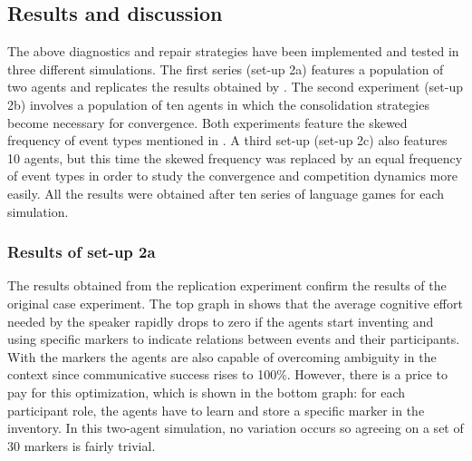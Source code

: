 \subsection{Results and discussion}

The above diagnostics and repair strategies have been implemented and tested in three different simulations. The first series (set-up 2a) features a population of two agents and replicates the results obtained by \citet{steels02simulating, steels04constructivist}. The second experiment (set-up 2b) involves a population of ten agents in which the consolidation strategies become necessary for convergence. Both experiments feature the skewed frequency of event types mentioned in . A third set-up (set-up 2c) also features 10 agents, but this time the skewed frequency was replaced by an equal frequency of event types in order to study the convergence and competition dynamics more easily. All the results were obtained after ten series of language games for each simulation.



\subsubsection{Results of set-up 2a}
 The results obtained from the replication experiment confirm the results of the original case experiment. The top graph in  shows that the average cognitive effort needed by the speaker rapidly drops to zero if the agents start inventing and using specific markers to indicate relations between events and their participants. With the markers the agents are also capable of overcoming ambiguity in the context since communicative success rises to 100\%. However, there is a price to pay for this optimization, which is shown in the bottom graph: for each participant role, the agents have to learn and store a specific marker in the inventory. In this two-agent simulation, no variation occurs so agreeing on a set of 30 markers is fairly trivial.

